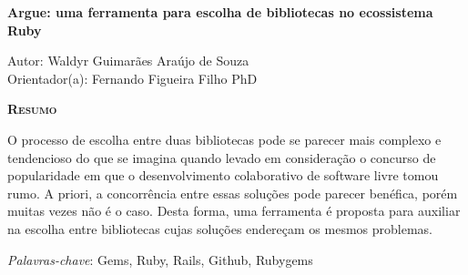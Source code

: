 \begin{center}
	{\Large{\textbf{Argue: uma ferramenta para escolha de bibliotecas no ecossistema Ruby}}}
\end{center}

\vspace{1cm}

\begin{flushright}
	Autor: Waldyr Guimarães Araújo de Souza\\
	Orientador(a): Fernando Figueira Filho PhD
\end{flushright}

\vspace{1cm}

\begin{center}
	\Large{\textsc{\textbf{Resumo}}}
\end{center}

\noindent O processo de escolha entre duas bibliotecas pode se parecer mais complexo e tendencioso do que se imagina quando levado em consideração o concurso de popularidade em que o desenvolvimento colaborativo de software livre tomou rumo. A priori, a concorrência entre essas soluções pode parecer benéfica, porém muitas vezes não é o caso. Desta forma, uma ferramenta é proposta para auxiliar na escolha entre bibliotecas cujas soluções endereçam os mesmos problemas.

\noindent\textit{Palavras-chave}: Gems, Ruby, Rails, Github, Rubygems